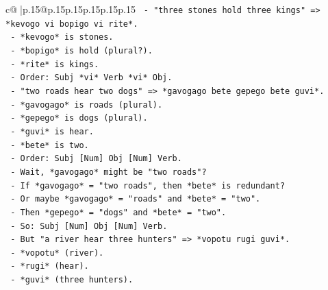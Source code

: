 \documentclass{article}
\begin{document}
{\begin{supertabular}{c@{$\;$}|p{.15\linewidth}@{}p{.15\linewidth}p{.15\linewidth}p{.15\linewidth}p{.15\linewidth}p{.15\linewidth}}
{{{\texttt{                                         {-} "three stones hold three kings" => *kevogo vi bopigo vi rite*.} \\
\texttt{                                           {-} *kevogo* is stones.} \\
\texttt{                                           {-} *bopigo* is hold (plural?).} \\
\texttt{                                           {-} *rite* is kings.} \\
\texttt{                                           {-} Order: Subj *vi* Verb *vi* Obj.} \\
\texttt{                                         {-} "two roads hear two dogs" => *gavogago bete gepego bete guvi*.} \\
\texttt{                                           {-} *gavogago* is roads (plural).} \\
\texttt{                                           {-} *gepego* is dogs (plural).} \\
\texttt{                                           {-} *guvi* is hear.} \\
\texttt{                                           {-} *bete* is two.} \\
\texttt{                                           {-} Order: Subj {[}Num{]} Obj {[}Num{]} Verb.} \\
\texttt{                                           {-} Wait, *gavogago* might be "two roads"?} \\
\texttt{                                           {-} If *gavogago* = "two roads", then *bete* is redundant?} \\
\texttt{                                           {-} Or maybe *gavogago* = "roads" and *bete* = "two".} \\
\texttt{                                           {-} Then *gepego* = "dogs" and *bete* = "two".} \\
\texttt{                                           {-} So: Subj {[}Num{]} Obj {[}Num{]} Verb.} \\
\texttt{                                           {-} But "a river hear three hunters" => *vopotu rugi guvi*.} \\
\texttt{                                             {-} *vopotu* (river).} \\
\texttt{                                             {-} *rugi* (hear).} \\
\texttt{                                             {-} *guvi* (three hunters).} \\
}}}
\end{supertabular}}
\end{document}
